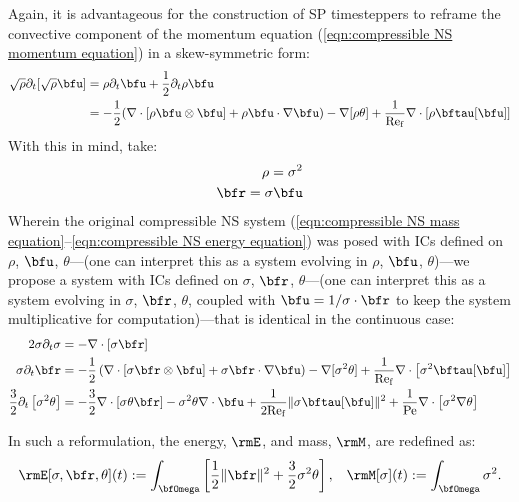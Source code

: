     \shortline

    Again, it is advantageous for the construction of SP timesteppers to reframe the convective component of the momentum equation (\ref{eqn:compressible NS momentum equation}) in a skew-symmetric form:
    \begin{align}
        \sqrt{\rho}\partial_{t}[\sqrt{\rho}\bfu]
        &=
        \rho\partial_{t}\bfu + \frac{1}{2}\partial_{t}\rho\bfu  \\
        &=
        - \frac{1}{2}(\nabla\cdot\left[\rho\bfu\otimes\bfu\right] + \rho\bfu\cdot\nabla\bfu) - \nabla[\rho\theta] + \frac{1}{\rmRef}\nabla\cdot[\rho\bftau[\bfu]]  \label{eqn:compressible NS skew-symmetric momentum equation}
    \end{align}
    With this in mind, take:
    \begin{align}
        \rho  =  \sigma^{2}  \label{eqn:sigma definition}  \\
        \bfr  =  \sigma\bfu  \label{eqn:r definition}
    \end{align}
    Wherein the original compressible NS system (\ref{eqn:compressible NS mass equation}--\ref{eqn:compressible NS energy equation}) was posed with ICs defined on $\rho$, $\bfu$, $\theta$---(one can interpret this as a system evolving in $\rho$, $\bfu$, $\theta$)---we propose a system with ICs defined on $\sigma$, $\bfr$, $\theta$---(one can interpret this as a system evolving in $\sigma$, $\bfr$, $\theta$, coupled with $\bfu = 1/\sigma\cdot\bfr$ to keep the system multiplicative for computation)---that is identical in the continuous case:
    \begin{align}
                                   2\sigma\partial_{t}\sigma  &=  - \nabla\cdot\left[\sigma\bfr\right]  \\
                                      \sigma\partial_{t}\bfr  &=  - \frac{1}{2}\left(\nabla\cdot\left[\sigma\bfr\otimes\bfu\right] + \sigma\bfr\cdot\nabla\bfu\right) - \nabla[\sigma^{2}\theta] + \frac{1}{\rmRef}\nabla\cdot\left[\sigma^{2}\bftau[\bfu]\right]  \\
        \frac{3}{2}\partial_{t}\left[\sigma^{2}\theta\right]  &=  - \frac{3}{2}\nabla\cdot\left[\sigma\theta\bfr\right] - \sigma^{2}\theta\nabla\cdot\bfu + \frac{1}{2\rmRef}\|\sigma\bftau[\bfu]\|^{2} + \frac{1}{\rmPe}\nabla\cdot\left[\sigma^{2}\nabla\theta\right]  \label{eqn:compressible NS sqrt energy equation}
    \end{align}

    In such a reformulation, the energy, $\rmE$, and mass, $\rmM$, are redefined as:
    \begin{align}
        \rmE[\sigma, \bfr, \theta](t)  :=  \int_{\bfOmega}\left[\frac{1}{2}\|\bfr\|^{2} + \frac{3}{2}\sigma^{2}\theta\right],  &&
                      \rmM[\sigma](t)  :=  \int_{\bfOmega}\sigma^{2}.
    \end{align}

